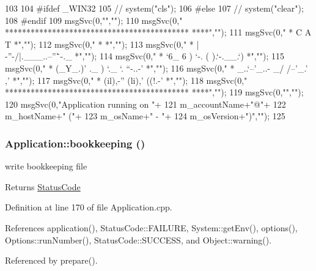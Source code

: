 \begin{DoxyCode}
103                            {
104 #ifdef _WIN32
105   //  system("cls");
106 #else
107   //  system("clear");
108 #endif
109   msgSvc(0,"","");
110   msgSvc(0,"                          *******************************************
      ****","");
111   msgSvc(0,"                          *               C      A      T            
         *","");
112   msgSvc(0,"                          *                                          
         *","");
113   msgSvc(0,"                          *          |\\-''-/|.___..--''\"`-._       
           *","");
114   msgSvc(0,"                          *          `6_ 6  )   `-.  (     ).`-.__.`)
         *","");
115   msgSvc(0,"                          *          (_Y_.)'  ._   )  `._ `. ``-..-' 
         *","");
116   msgSvc(0,"                          *         _..`--'_..-  _/ /--'_.' ,'       
         *","");
117   msgSvc(0,"                          *     (il),-''  (li),' ((!.-'              
         *","");
118   msgSvc(0,"                          *******************************************
      ****","");
119   msgSvc(0,"","");
120   msgSvc(0,"Application running on "+
121      m_accountName+"@"+
122      m_hostName+" ("+
123      m_osName+" - "+
124      m_osVersion+")","");
125 }
\end{DoxyCode}
\hypertarget{classApplication_ad5faa0fa744706190844bbc4be58b700}{
\subsubsection[{bookkeeping}]{ Application::bookkeeping ()}}
\label{classApplication_ad5faa0fa744706190844bbc4be58b700}
write bookkeeping file \begin{DoxyReturn}{Returns}
\hyperlink{classStatusCode}{StatusCode} 
\end{DoxyReturn}


Definition at line 170 of file Application.cpp.

References application(), StatusCode::FAILURE, System::getEnv(), options(), Options::runNumber(), StatusCode::SUCCESS, and Object::warning().

Referenced by prepare().


